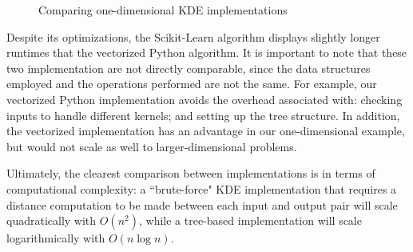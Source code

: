 \documentclass[11pt]{article}
\begin{document}
\begin{figure}[h!]
\centering
{}
\caption{Comparing one-dimensional KDE implementations}
\label{fig:compare_kde}
\end{figure}

\noindent Despite its optimizations, the Scikit-Learn algorithm displays slightly longer runtimes that the vectorized Python algorithm. It is important to note that these two implementation are not directly comparable, since the data structures employed and the operations performed are not the same. For example, our vectorized Python implementation avoids the overhead associated with: checking inputs to handle different kernels; and setting up the tree structure. In addition, the vectorized implementation has an advantage in our one-dimensional example, but would not scale as well to larger-dimensional problems. \medskip

\noindent Ultimately, the clearest comparison between implementations is in terms of computational complexity: a ``brute-force" KDE implementation that requires a distance computation to be made between each input and output pair will scale quadratically with $O(n^2)$, while a tree-based implementation will scale logarithmically with $O(n \log n)$.
\end{document}
